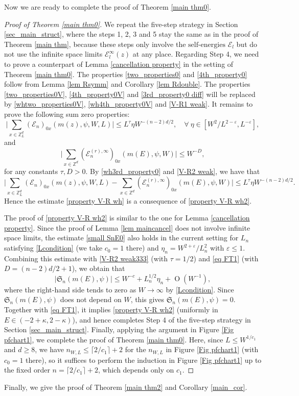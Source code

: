 \documentclass{article}
\newcommand{\1}{\mathds{1}}
\numberwithin{equation}{section}
\newcommand{\be}{\begin{equation}}
\newcommand{\ee}{\end{equation}}
\newcommand{\e}{{\varepsilon}}
\renewcommand{\leq}{\leqslant}
\renewcommand{\geq}{\geqslant}
\renewcommand{\le}{\leq}
\renewcommand{\ge}{\geq}
\newcommand{\Z}{\mathbb{Z}}
\newcommand{\selfs}{\text{self-energies}}
\DeclareMathOperator{\OO}{O}
\theoremstyle{plain} %
\theoremstyle{remark}
\newcommand{\Sele}{{\mathcal E}}
\newcommand{\Sint}{\mathfrak S}
\begin{document}
Now we are ready to complete the proof of Theorem \ref{main thm0}. %
\begin{proof}[Proof of Theorem \ref{main thm0}]
We repeat the five-step strategy in Section \ref{sec_main_struct}, where the steps 1, 2, 3 and 5 stay the same as in the proof of Theorem \ref{main thm}, because these steps only involve the $\selfs$ $\Sele_l$ but do not use the infinite space limits $\Sele^{\infty}_l(z)$ at any place. Regarding Step 4, we need to prove a counterpart of Lemma \ref{cancellation property} in the setting of Theorem \ref{main thm0}. 
The properties \eqref{two_properties0} and \eqref{4th_property0} follow from Lemma \ref{lem Rsymm} and Corollary \ref{lem Rdouble}. The properties \eqref{two_properties0V}, \eqref{4th_property0V} and \eqref{3rd_property0 diff} will be replaced by \eqref{whtwo_properties0V}, \eqref{wh4th_property0V} and \eqref{V-R1 weak}. It remains to prove the following sum zero properties: %
\be\label{property V-R wh}
\Big|\sum_{x\in \Z_L^d} ( \Sele_{n})_{0x} (m(z),\psi, W, L) \Big|   \le L^\tau \eta W^{-(n-2)d/2 },\quad \forall \ \eta\in[  W^{2}/L^{2-\e} ,L^{-\e}],
\ee
and 
\be\label{property V-R wh2}
\Big|\sum_{x\in \Z^d} (\Sele^{(r),\infty}_{n})_{0x} (m(E),\psi, W) \Big|   \le W^{-D}  ,
\ee
for any constants $\tau, D>0$. By \eqref{wh3rd_property0} and \eqref{V-R2 weak}, we have that
\be\label{V-R2 weak333} \Big|\sum_{x\in \Z_L^d} ( \Sele_n)_{0x}(m(z),\psi, W, L)-\sum_{x\in \Z^d}( \Sele^{(r),\infty}_n)_{0x}( m(E), \psi, W) \Big| \le L^\tau \eta W^{-(n-2)d/2 } .\ee
Hence the estimate \eqref{property V-R wh} is a consequence of \eqref{property V-R wh2}.

The proof of \eqref{property V-R wh2} is similar to the one for Lemma \ref{cancellation property}. Since the proof of Lemma \ref{lem maincancel} does not involve infinite space limits, the estimate \eqref{small SnE0} also holds in the current setting for $L_n$ satisfying \eqref{Lcondition} (we take $c_0=1$ there) and $\eta_n=W^{2+\e}/L_n^2$ with $\e\le 1$. Combining this estimate with \eqref{V-R2 weak333} (with $\tau=1/2$) and \eqref{eq FT1} (with $D=(n-2)d/2+1$), we obtain that 
$$\left| {\Sint}_{n}(m(E), \psi)\right| \le W^{-c} + L_n^{1/2}\eta_n + \OO(W^{-1}),$$
where the right-hand side tends to zero as $W\to \infty$ by \eqref{Lcondition}. Since ${\Sint}_{n}(m(E), \psi)$ does not depend on $W$, this gives ${\Sint}_{n}(m(E), \psi)=0$. Together with \eqref{eq FT1}, it implies \eqref{property V-R wh2} (uniformly in $E\in(-2+\kappa,2-\kappa)$), and hence completes Step 4 of the five-step strategy in Section \ref{sec_main_struct}. Finally, applying the argument in Figure \ref{Fig pfchart1}, we complete the proof of Theorem \ref{main thm0}. Here, since $L\le W^{1/c_1}$ and $d\ge 8$, we have $n_{W,L}\le \lceil 2/c_1\rceil+2$ for the $n_{W,L}$ in Figure \ref{Fig pfchart1} (with $c_0=1$ there), so it suffices to perform the induction in Figure \ref{Fig pfchart1} up to the fixed order $n=\lceil 2/c_1\rceil+2$, which depends only on $c_1$.
\end{proof}
Finally, we give the proof of Theorem \ref{main thm2} and Corollary \ref{main_cor}.
\end{document}
